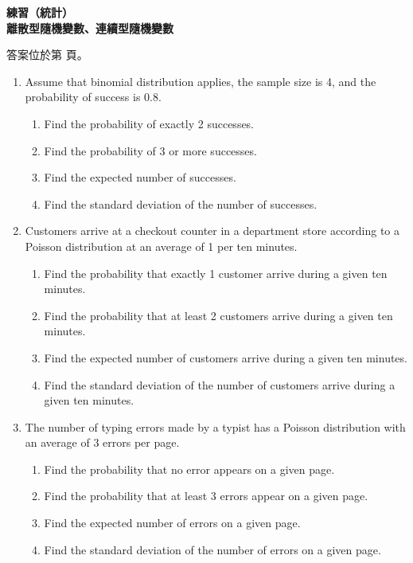 \documentclass[10pt]{article}
\renewcommand*{\maketitle}{{%
  \bfseries
  \LARGE 練習（統計） \\
  \large 離散型隨機變數、連續型隨機變數 \par
}}
\begin{document}
\maketitle
\medskip
答案位於第 \pageref{answer} 頁。
\begin{enumerate}[label=\arabic*.,align=left,leftmargin=*,labelsep=.5em]
  \item Assume that binomial distribution applies, the sample size is 4, and the probability of success is 0.8.
  \begin{enumerate}[label=(\alph*),left=0pt,widest=a,topsep=0ex]
    \item Find the probability of exactly 2 successes.
    \item Find the probability of 3 or more successes.
    \item Find the expected number of successes.
    \item Find the standard deviation of the number of successes.
  \end{enumerate}
  \newpage
  \item Customers arrive at a checkout counter in a department store according to a Poisson distribution
  at an average of 1 per ten minutes.
  \begin{enumerate}[label=(\alph*),left=0pt,widest=a,topsep=0ex]
    \item Find the probability that exactly 1 customer arrive during a given ten minutes.
    \item Find the probability that at least 2 customers arrive during a given ten minutes.
    \item Find the expected number of customers arrive during a given ten minutes.
    \item Find the standard deviation of the number of customers arrive during a given ten minutes.
  \end{enumerate}
  \newpage
  \item The number of typing errors made by a typist has a Poisson distribution with an average of 3 errors per page.
  \begin{enumerate}[label=(\alph*),left=0pt,widest=a,topsep=0ex]
    \item Find the probability that no error appears on a given page.
    \item Find the probability that at least 3 errors appear on a given page.
    \item Find the expected number of errors on a given page.
    \item Find the standard deviation of the number of errors on a given page.

\end{enumerate}
\end{enumerate}
\end{document}
